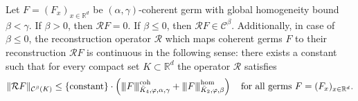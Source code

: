 \begin{theorem}\label{theorem:rec-and-negative-hoelder}
  Let \( F = (F_x)_{x \in \mathbb{R}^d} \) be \( (\alpha, \gamma) \)-coherent germ with global homogeneity bound \( \beta < \gamma \). If \( \beta > 0 \), then \( \mathcal{R}F = 0 \). If \( \beta \leq 0 \), then \( \mathcal{R}F \in \mathcal{C}^\beta \). Additionally, in case of \( \beta \leq 0 \), the reconstruction operator \( \mathcal{R} \) which maps coherent germs \( F \) to their reconstruction \( \mathcal{R}F \) is continuous in the following sense: there exists a constant such that for every compact set \( K \subset \mathbb{R}^d \) the operator \( \mathcal{R} \) satisfies
  \begin{gather}\label{equation:rec-and-negative-hoelder}
    \lVert \mathcal{R}F \rVert_{\mathcal{C}^\beta(K)} \leq \left\{ \mathrm{constant} \right\} \cdot \left( 
        {\left\vert\kern-0.25ex\left\vert\kern-0.25ex\left\vert F \right\vert\kern-0.25ex\right\vert\kern-0.25ex\right\vert}^{\mathrm{coh}}_{\bar{K}_{4}, \varphi, \alpha, \gamma} + {\left\vert\kern-0.25ex\left\vert\kern-0.25ex\left\vert F \right\vert\kern-0.25ex\right\vert\kern-0.25ex\right\vert}^{\mathrm{\hom}}_{\bar{K}_{2}, \varphi, \beta}
     \right) \quad \text{for all germs \( F = (F_x)_{x \in \mathbb{R}^d} \)}.
  \end{gather}
\end{theorem}

